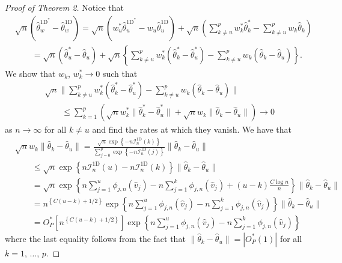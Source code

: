 \documentclass{article}\usepackage[]{graphicx}\usepackage[]{color}
\newcommand{\That}{\widehat{\theta}}
\newcommand{\TD}{\widehat{\theta}^{\text{1D}}}
\newcommand{\Tstar}{\widehat{\theta}^{\textstyle{*}}}
\newcommand{\TstarD}{\widehat{\theta}^{{\text{1D}}^{\textstyle{*}}}}
\newcommand{\wstar}{w^{\textstyle{*}}}
\newcommand{\rootn}{\sqrt{n}}
\newcommand{\IoneD}{\mathcal{I}_n^{\text{1D}}}
\begin{document}
\begin{proof}[Proof of Theorem 2]
Notice that 
\begin{align*}
  &\rootn\left(\TstarD_w - \TD_w\right)  
    = \rootn\left(\wstar_u\TstarD_u - w_u\TD_u\right) 
      + \rootn\left(\sum_{k\neq u}^p\wstar_k\Tstar_k 
        - \sum_{k \neq u}^p w_k\That_k\right) \\
  &\qquad = \rootn\left(\Tstar_u - \That_u\right) 
      + \rootn\left\{\sum_{k\neq u}^p\wstar_k\left(\Tstar_k - \Tstar_u\right)
        - \sum_{k \neq u}^p w_k\left(\That_k - \That_u\right)\right\}.
\end{align*}
We show that $w_k$, $\wstar_k \to 0$ such that 
\begin{align*}
  &\rootn\|\sum_{k\neq u}^p\wstar_k\left(\Tstar_k - \Tstar_u\right) 
    - \sum_{k \neq u}^p w_k\left(\That_k - \That_u\right)\| \\
  &\qquad\leq \sum_{k=1}^p\left(\rootn\wstar_k\|\Tstar_k - \Tstar_u\| 
    + \rootn w_k\|\That_k - \That_u\|\right) \to 0
\end{align*}
as $n\to\infty$ for all $k \neq u$ and find the rates at which they vanish. 
We have that 
\begin{equation}
\begin{split}
  &\rootn w_k\|\That_k - \That_u\| = \frac
    {
      \rootn\exp\left\{-n\IoneD(k)\right\}
    }
    {
      \sum_{j=0}^p\exp\left\{-n\IoneD(j)\right\}
    }\|\That_k - \That_u\| \\
  &\qquad \leq \rootn\exp\left\{n\IoneD(u) - n\IoneD(k)\right\}
    \|\That_k - \That_u\| \\
  &\qquad= \rootn\exp\left\{
      n\sum_{j=1}^u \phi_{j,n}(\hat{v}_j) - n\sum_{j=1}^k\phi_{j,n}(\hat{v}_j) 
        + (u - k)\frac{C\log{n}}{n}
    \right\}\|\That_k - \That_u\| \\
  &\qquad= n^{\left\{C(u - k) + 1/2\right\}}\exp\left\{
      n\sum_{j=1}^u \phi_{j,n}(\hat{v}_j) - n\sum_{j=1}^k\phi_{j,n}(\hat{v}_j) 
    \right\}\|\That_k - \That_u\| \\
  &\qquad= O_P^{\textstyle{*}}\left[n^{\left\{C(u - k) + 1/2\right\}}\right]
  \exp\left\{
      n\sum_{j=1}^u \phi_{j,n}(\hat{v}_j) - n\sum_{j=1}^k\phi_{j,n}(\hat{v}_j) 
    \right\}
\end{split}
\label{foo}
\end{equation}
where the last equality follows from the fact that 
$\|\That_k - \That_u\| = |O_P^{\textstyle{*}}(1)|$ for all $k = 1$, $\ldots$, $p$. 

\end{proof}
\end{document}
